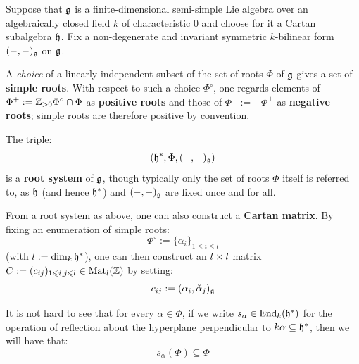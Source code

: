             \begin{definition}
                Suppose that $\mathfrak{g}$ is a finite-dimensional semi-simple Lie algebra over an algebraically closed field $k$ of characteristic $0$ and choose for it a Cartan subalgebra $\mathfrak{h}$. Fix a non-degenerate and invariant symmetric $k$-bilinear form $(-, -)_{\mathfrak{g}}$ on $\mathfrak{g}$.
                
                A \textit{choice} of a linearly independent subset of the set of roots $\Phi$ of $\mathfrak{g}$ gives a set of \textbf{simple roots}. With respect to such a choice $\Phi^{\circ}$, one regards elements of $\Phi^+ := \mathbb{Z}_{> 0} \Phi^{\circ} \cap \Phi$ as \textbf{positive roots} and those of $\Phi^- := -\Phi^+$ as \textbf{negative roots}; simple roots are therefore positive by convention.

                The triple:
                    $$(\mathfrak{h}^*, \Phi, (-, -)_{\mathfrak{g}})$$
                is a \textbf{root system} of $\mathfrak{g}$, though typically only the set of roots $\Phi$ itself is referred to, as $\mathfrak{h}$ (and hence $\mathfrak{h}^*$) and $(-, -)_{\mathfrak{g}}$ are fixed once and for all. 

                From a root system as above, one can also construct a \textbf{Cartan matrix}. By fixing an enumeration of simple roots:
                    $$\Phi^{\circ} := \{\alpha_i\}_{1 \leq i \leq l}$$
                (with $l := \dim_k \mathfrak{h}^*$), one can then construct an $l \x l$ matrix $C := (c_{ij})_{1 \leqslant i, j \leqslant l} \in \mathrm{Mat}_l(\mathbb{Z})$ by setting:
                    $$c_{ij} := (\alpha_i, \check{\alpha}_j)_{\mathfrak{g}}$$
            \end{definition}
            \begin{remark}
                It is not hard to see that for every $\alpha \in \Phi$, if we write $s_{\alpha} \in \mathrm{End}_k(\mathfrak{h}^*)$ for the operation of reflection about the hyperplane perpendicular to $k \alpha \subseteq \mathfrak{h}^*$, then we will have that:
                    $$s_{\alpha}(\Phi) \subseteq \Phi$$
            \end{remark}
